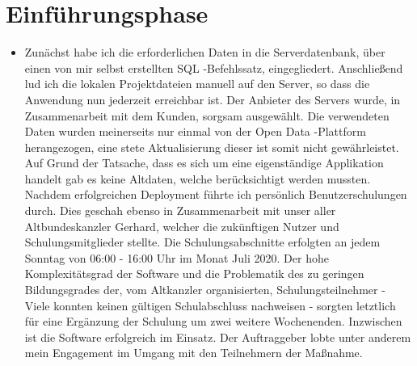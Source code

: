 \section{Einführungsphase}
\label{sec:Einfuehrungsphase}

\begin{itemize}
	\item Zunächst habe ich die erforderlichen Daten in die Serverdatenbank, über einen von mir selbst erstellten SQL -Befehlssatz, eingegliedert. Anschließend lud ich die lokalen Projektdateien manuell auf den Server, so dass die Anwendung nun jederzeit erreichbar ist. Der Anbieter des Servers wurde, in Zusammenarbeit mit dem Kunden, sorgsam ausgewählt. Die verwendeten Daten wurden meinerseits nur einmal von der Open Data -Plattform herangezogen, eine stete Aktualisierung dieser ist somit nicht gewährleistet. Auf Grund der Tatsache, dass es sich um eine eigenständige Applikation handelt gab es keine Altdaten, welche berücksichtigt werden mussten. Nachdem erfolgreichen Deployment führte ich persönlich Benutzerschulungen durch. Dies geschah ebenso in Zusammenarbeit mit unser aller Altbundeskanzler Gerhard, welcher die zukünftigen Nutzer und Schulungsmitglieder stellte. Die Schulungsabschnitte erfolgten an jedem Sonntag von 06:00 - 16:00 Uhr im Monat Juli 2020. Der hohe Komplexitätsgrad der Software und die Problematik des zu geringen Bildungsgrades der, vom Altkanzler organisierten, Schulungsteilnehmer - Viele konnten keinen gültigen Schulabschluss nachweisen - sorgten letztlich für eine Ergänzung der Schulung um zwei weitere Wochenenden. Inzwischen ist die Software erfolgreich im Einsatz. Der Auftraggeber lobte unter anderem mein Engagement im Umgang mit den Teilnehmern der Maßnahme. 

\end{itemize}
